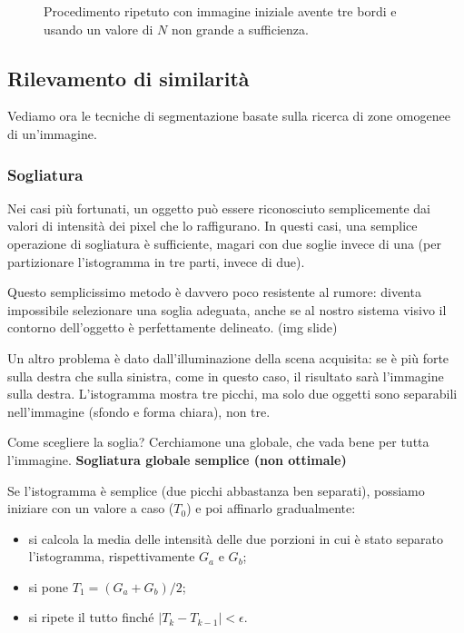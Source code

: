 \documentclass[a4paper,11pt]{article}
\begin{document}
\begin{figure}[!h]
\begin{subfigure}{.3\textwidth}
\end{subfigure}
\caption{Procedimento ripetuto con immagine iniziale avente tre bordi e usando un valore di $N$ non grande a sufficienza.}
\end{figure}

\subsection{Rilevamento di similarità}
Vediamo ora le tecniche di segmentazione basate sulla ricerca di zone omogenee di un'immagine.

\subsubsection{Sogliatura}
Nei casi più fortunati, un oggetto può essere riconosciuto semplicemente dai valori di intensità dei pixel che lo raffigurano. In questi casi,
una semplice operazione di sogliatura è sufficiente, magari con due soglie invece di una (per partizionare l'istogramma in tre parti, invece di due).
\par
Questo semplicissimo metodo è davvero poco resistente al rumore: diventa impossibile selezionare una soglia adeguata, anche se al nostro sistema visivo
il contorno dell'oggetto è perfettamente delineato. (img slide)
\par
Un altro problema è dato dall'illuminazione della scena acquisita: se è più forte sulla destra che sulla sinistra, come in questo caso,
il risultato sarà l'immagine sulla destra. L'istogramma mostra tre picchi, ma solo due oggetti sono separabili nell'immagine (sfondo e forma chiara), non tre.
\par
Come scegliere la soglia? Cerchiamone una globale, che vada bene per tutta l'immagine.
\newline
\newline
\textbf{Sogliatura globale semplice (non ottimale)}
\par
Se l'istogramma è semplice (due picchi abbastanza ben separati), possiamo iniziare con un valore a caso ($T_0$) e poi affinarlo gradualmente:
\begin{itemize}
    \item si calcola la media delle intensità delle due porzioni in cui è stato separato l'istogramma, rispettivamente $G_a$ e $G_b$;
    \item si pone $T_1 = (G_a + G_b) / 2$;
    \item si ripete il tutto finché $|T_k - T_{k-1}| < \epsilon$.
\end{itemize}
\end{document}
